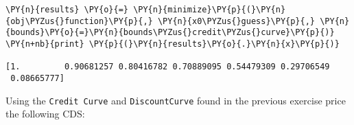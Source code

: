 \begin{Answer}
\begin{codebox}[size=fbox, boxrule=1pt,colback=cellbackground, colframe=cellborder]
\begin{Verbatim}[commandchars=\\\{\}]
\PY{n}{results} \PY{o}{=} \PY{n}{minimize}\PY{p}{(}\PY{n}{obj\PYZus{}function}\PY{p}{,} \PY{n}{x0\PYZus{}guess}\PY{p}{,} \PY{n}{bounds}\PY{o}{=}\PY{n}{bounds\PYZus{}credit\PYZus{}curve}\PY{p}{)}
\PY{n+nb}{print} \PY{p}{(}\PY{n}{results}\PY{o}{.}\PY{n}{x}\PY{p}{)}

[1.         0.90681257 0.80416782 0.70889095 0.54479309 0.29706549
 0.08665777]
\end{Verbatim}  
\end{codebox}
\end{Answer}

\begin{Exercise}
Using the \texttt{Credit\ Curve} and \texttt{DiscountCurve} found in the previous exercise price the following CDS:

\begin{Shaded}
\begin{Highlighting}[]
\OperatorTok{=}\NormalTok{ [}
\NormalTok{    \{}\NormalTok{: }\NormalTok{, }\NormalTok{: }\NormalTok{, }\NormalTok{: }\NormalTok{\},}
\NormalTok{    \{}\NormalTok{: }\NormalTok{, }\NormalTok{: }\NormalTok{, }\NormalTok{: }\NormalTok{\},}
\NormalTok{    \{}\NormalTok{: }\NormalTok{, }\NormalTok{: }\NormalTok{, }\NormalTok{: }\NormalTok{\},}
\NormalTok{    \{}\NormalTok{: }\NormalTok{, }\NormalTok{: }\NormalTok{, }\NormalTok{: }\NormalTok{\},}
\NormalTok{    \{}\NormalTok{: }\NormalTok{, }\NormalTok{: }\NormalTok{, }\NormalTok{: }\NormalTok{\},}
\NormalTok{    \{}\NormalTok{: }\NormalTok{, }\NormalTok{: }\NormalTok{, }\NormalTok{: }\NormalTok{\},}
\NormalTok{    \{}\NormalTok{: }\NormalTok{, }\NormalTok{: }\NormalTok{, }\NormalTok{: }\NormalTok{\},}
\NormalTok{    \{}\NormalTok{: }\NormalTok{, }\NormalTok{: }\NormalTok{, }\NormalTok{: }\NormalTok{\},}
\NormalTok{    \{}\NormalTok{: }\NormalTok{, }\NormalTok{: }\NormalTok{, }\NormalTok{: }\NormalTok{\}}
\NormalTok{]}
\end{Highlighting}
\end{Shaded}
\end{Exercise}

